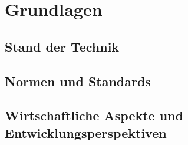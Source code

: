 \section{Grundlagen}
\label{sec:grundlagen}

\subsection{Stand der Technik}
\subsection{Normen und Standards}
\subsection{Wirtschaftliche Aspekte und Entwicklungsperspektiven}
